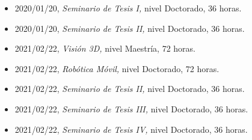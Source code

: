 \begin{itemize}
\item 2020/01/20, \textit{ Seminario de Tesis I,} nivel Doctorado, 36 horas. 
\item 2020/01/20, \textit{ Seminario de Tesis II,} nivel Doctorado, 36 horas. 
\item 2021/02/22, \textit{ Visión 3D,} nivel Maestría, 72 horas. 
\item 2021/02/22, \textit{ Robótica Móvil,} nivel Doctorado, 72 horas. 
\item 2021/02/22, \textit{ Seminario de Tesis II,} nivel Doctorado, 36 horas. 
\item 2021/02/22, \textit{ Seminario de Tesis III,} nivel Doctorado, 36 horas. 
\item 2021/02/22, \textit{ Seminario de Tesis IV,} nivel Doctorado, 36 horas. 
\end{itemize} 
